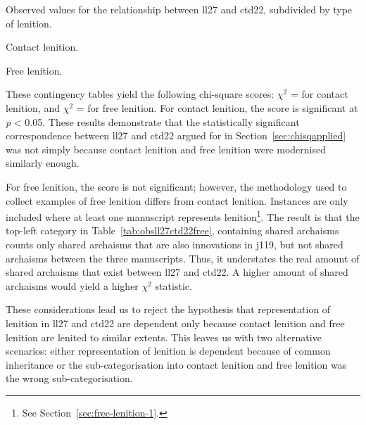 \begin{table}[h]
  \caption{Observed values for the relationship between  \acrshort{ll27} and \acrshort{ctd22}, subdivided by type of lenition.}
  \label{tab:obsll27ctd22freecontact}
  \begin{subtable}[b]{0.5\linewidth}
    \centering
    \caption{Contact lenition.}
    \label{tab:contactlentab}
    
  \end{subtable}%
  \begin{subtable}[b]{0.5\linewidth}
    \centering
    \caption{Free lenition.}
    \label{tab:obsll27ctd22free}
    
  \end{subtable}
\end{table}

 These contingency tables yield the following chi-square scores: \(\chi^2\) =  for contact lenition, and \(\chi^2\) =  for free lenition. For contact lenition, the score is significant at \emph{p} < 0.05. These results  demonstrate that the statistically significant correspondence between \gls{ll27} and \gls{ctd22} argued for in Section~\ref{sec:chisqapplied} was not simply because contact lenition and free lenition were modernised similarly enough. 

For free lenition, the score is not significant; however, the methodology used to collect examples of free lenition differs from contact lenition. Instances are only included where at least one manuscript represents lenition\footnote{See Section~\ref{sec:free-lenition-1}.}. The result is that the top-left category in Table~\ref{tab:obsll27ctd22free}, containing shared archaisms counts only shared archaisms that are also innovations in \gls{j119}, but not shared archaisms between the three manuscripts. Thus, it understates the real amount of shared archaisms that exist between \gls{ll27} and \gls{ctd22}. A higher amount of shared archaisms would yield a higher \(\chi^2\) statistic.

These considerations lead us to reject the hypothesis that representation of lenition in \gls{ll27} and \gls{ctd22} are dependent only because contact lenition and free lenition are lenited to similar extents. This leaves us with two alternative scenarios: either representation of lenition is dependent because of common inheritance or the sub-categorisation into contact lenition and free lenition was the wrong sub-categorisation.

